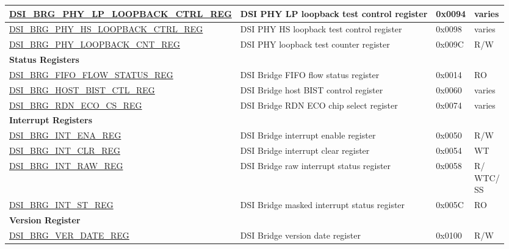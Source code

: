 \begin{longtable}{ | p{6.8cm} | p{7.2cm} | p{1.3cm} | p{1cm} | }
\hyperref[regdesc:DSIBRGPHYLPLOOPBACKCTRLREG]{DSI\_BRG\_PHY\_LP\_LOOPBACK\_CTRL\_REG} & DSI PHY LP loopback test control register & 0x0094 & varies \\ \hline
\hyperref[regdesc:DSIBRGPHYHSLOOPBACKCTRLREG]{DSI\_BRG\_PHY\_HS\_LOOPBACK\_CTRL\_REG} & DSI PHY HS loopback test control register & 0x0098 & varies \\ \hline
\hyperref[regdesc:DSIBRGPHYLOOPBACKCNTREG]{DSI\_BRG\_PHY\_LOOPBACK\_CNT\_REG} & DSI PHY loopback test counter register & 0x009C & R/W \\ \hline
\multicolumn{4}{|l|}{\textbf{Status Registers}} \\ \hline
\hyperref[regdesc:DSIBRGFIFOFLOWSTATUSREG]{DSI\_BRG\_FIFO\_FLOW\_STATUS\_REG} & DSI Bridge FIFO flow status register & 0x0014 & RO \\ \hline
\hyperref[regdesc:DSIBRGHOSTBISTCTLREG]{DSI\_BRG\_HOST\_BIST\_CTL\_REG} & DSI Bridge host BIST control register & 0x0060 & varies \\ \hline
\hyperref[regdesc:DSIBRGRDNECOCSREG]{DSI\_BRG\_RDN\_ECO\_CS\_REG} & DSI Bridge RDN ECO chip select register & 0x0074 & varies \\ \hline
\multicolumn{4}{|l|}{\textbf{Interrupt Registers}} \\ \hline
\hyperref[regdesc:DSIBRGINTENAREG]{DSI\_BRG\_INT\_ENA\_REG} & DSI Bridge interrupt enable register & 0x0050 & R/W \\ \hline
\hyperref[regdesc:DSIBRGINTCLRREG]{DSI\_BRG\_INT\_CLR\_REG} & DSI Bridge interrupt clear register & 0x0054 & WT \\ \hline
\hyperref[regdesc:DSIBRGINTRAWREG]{DSI\_BRG\_INT\_RAW\_REG} & DSI Bridge raw interrupt status register & 0x0058 & \makecell[l]{R/\\WTC/\\SS} \\ \hline
\hyperref[regdesc:DSIBRGINTSTREG]{DSI\_BRG\_INT\_ST\_REG} & DSI Bridge masked interrupt status register & 0x005C & RO \\ \hline
\multicolumn{4}{|l|}{\textbf{Version Register}} \\ \hline
\hyperref[regdesc:DSIBRGVERDATEREG]{DSI\_BRG\_VER\_DATE\_REG} & DSI Bridge version date register & 0x0100 & R/W \\ \hline
\end{longtable}
